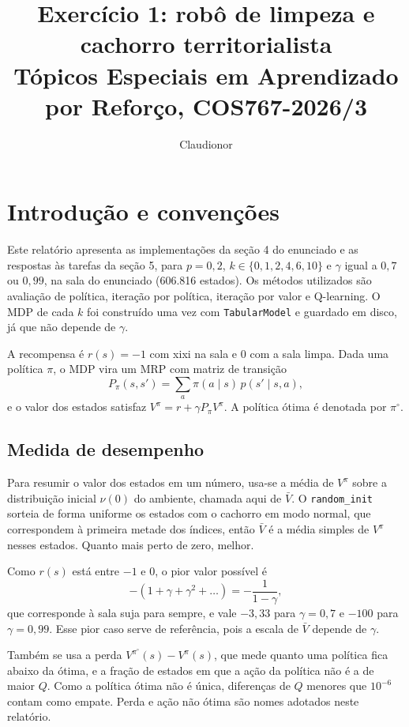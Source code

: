 \documentclass[11pt,a4paper]{article}
\title{Exercício 1: robô de limpeza e cachorro territorialista\\[4pt]
\large Tópicos Especiais em Aprendizado por Reforço, COS767-2026/3}
\author{Claudionor}
\date{}
\newcommand{\Vbar}{\bar{V}}
\newcommand{\code}[1]{\texttt{#1}}
\begin{document}
\maketitle

\section{Introdução e convenções}

Este relatório apresenta as implementações da seção 4 do enunciado e as respostas às tarefas da seção 5, para $p = 0{,}2$, $k \in \{0, 1, 2, 4, 6, 10\}$ e $\gamma$ igual a $0{,}7$ ou $0{,}99$, na sala do enunciado (606.816 estados). Os métodos utilizados são avaliação de política, iteração por política, iteração por valor e Q-learning. O MDP de cada $k$ foi construído uma vez com \code{TabularModel} e guardado em disco, já que não depende de $\gamma$.

A recompensa é $r(s) = -1$ com xixi na sala e $0$ com a sala limpa. Dada uma política $\pi$, o MDP vira um MRP com matriz de transição
\[
P_\pi(s, s') = \sum_a \pi(a \mid s)\, p(s' \mid s, a),
\]
e o valor dos estados satisfaz $V^\pi = r + \gamma P_\pi V^\pi$. A política ótima é denotada por $\pi^\circ$.

\subsection*{Medida de desempenho}

Para resumir o valor dos estados em um número, usa-se a média de $V^\pi$ sobre a distribuição inicial $\nu(0)$ do ambiente, chamada aqui de $\Vbar$. O \code{random\_init} sorteia de forma uniforme os estados com o cachorro em modo normal, que correspondem à primeira metade dos índices, então $\Vbar$ é a média simples de $V^\pi$ nesses estados. Quanto mais perto de zero, melhor.

Como $r(s)$ está entre $-1$ e $0$, o pior valor possível é
\[
-(1 + \gamma + \gamma^2 + \dots) = -\frac{1}{1-\gamma},
\]
que corresponde à sala suja para sempre, e vale $-3{,}33$ para $\gamma = 0{,}7$ e $-100$ para $\gamma = 0{,}99$. Esse pior caso serve de referência, pois a escala de $\Vbar$ depende de $\gamma$.

Também se usa a perda $V^{\pi^\circ}(s) - V^\pi(s)$, que mede quanto uma política fica abaixo da ótima, e a fração de estados em que a ação da política não é a de maior $Q$. Como a política ótima não é única, diferenças de $Q$ menores que $10^{-6}$ contam como empate. Perda e ação não ótima são nomes adotados neste relatório.
\end{document}
